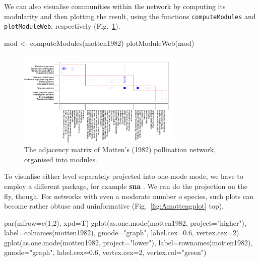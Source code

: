 \documentclass[a4paper, 11pt]{article}\usepackage[]{graphicx}\usepackage[]{color}
\newcommand{\package}[1]{\textbf{#1}}
\begin{document}
%
We can also visualise communities within the network by computing its modularity and then plotting the result, using the functions \texttt{computeModules} and \texttt{plotModuleWeb}, respectively (Fig.~\ref{fig:Amoduleplot}).
\begin{Schunk}
\begin{Sinput}
mod <- computeModules(motten1982)
plotModuleWeb(mod)
\end{Sinput}
\end{Schunk}
\begin{figure}%
\centering
	\includegraphics[width=0.7\textwidth]{figures/motten1982_moduleplot}
	\caption{The adjacency matrix of Motten's (1982) pollination network, organised into modules.}
	\label{fig:Amoduleplot}
\end{figure}
%
To visualise either level separately projected into one-mode mode, we have to employ a different package, for example \package{sna} \citep{Butts2013}. We can do the projection on the fly, though. For networks with even a moderate number o species, such plots can become rather obtuse and uninformative (Fig.~\ref{fig:Amottengplot} top).
\begin{Schunk}
\begin{Sinput}
par(mfrow=c(1,2), xpd=T)
gplot(as.one.mode(motten1982, project="higher"), 
 label=colnames(motten1982), gmode="graph", 
label.cex=0.6, vertex.cex=2)
gplot(as.one.mode(motten1982, project="lower"), 
	label=rownames(motten1982), gmode="graph", 
	label.cex=0.6, vertex.cex=2, vertex.col="green")
\end{Sinput}
\end{Schunk}
%
\end{document}
